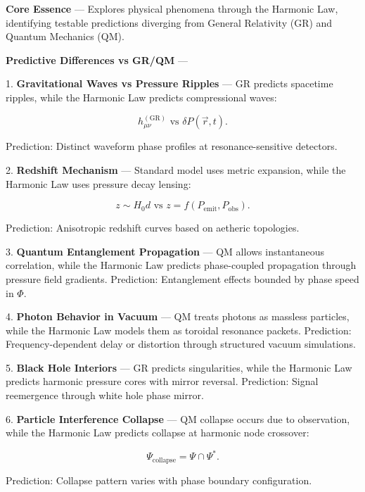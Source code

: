 
\textbf{Core Essence} --- Explores physical phenomena through the Harmonic Law, identifying testable predictions diverging from General Relativity (GR) and Quantum Mechanics (QM).

\textbf{Predictive Differences vs GR/QM} ---

1. \textbf{Gravitational Waves vs Pressure Ripples} --- GR predicts spacetime ripples, while the Harmonic Law predicts compressional waves:

$$
h_{\mu \nu}^{(\mathrm{GR})} \text{ vs } \delta P(\vec{r}, t).
$$

Prediction: Distinct waveform phase profiles at resonance-sensitive detectors.

2. \textbf{Redshift Mechanism} --- Standard model uses metric expansion, while the Harmonic Law uses pressure decay lensing:

$$
z \sim H_0 d \text{ vs } z = f(P_{\text{emit}}, P_{\text{obs}}).
$$

Prediction: Anisotropic redshift curves based on aetheric topologies.

3. \textbf{Quantum Entanglement Propagation} --- QM allows instantaneous correlation, while the Harmonic Law predicts phase-coupled propagation through pressure field gradients. Prediction: Entanglement effects bounded by phase speed in $\Phi$.

4. \textbf{Photon Behavior in Vacuum} --- QM treats photons as massless particles, while the Harmonic Law models them as toroidal resonance packets. Prediction: Frequency-dependent delay or distortion through structured vacuum simulations.

5. \textbf{Black Hole Interiors} --- GR predicts singularities, while the Harmonic Law predicts harmonic pressure cores with mirror reversal. Prediction: Signal reemergence through white hole phase mirror.

6. \textbf{Particle Interference Collapse} --- QM collapse occurs due to observation, while the Harmonic Law predicts collapse at harmonic node crossover:

$$
\Psi_{\text{collapse}} = \Psi \cap \Psi^*.
$$

Prediction: Collapse pattern varies with phase boundary configuration.

